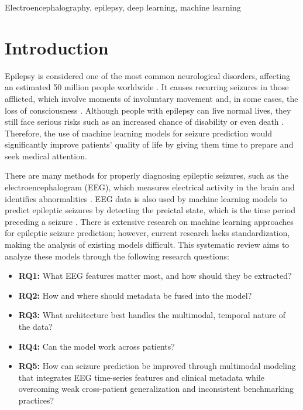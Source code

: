 \documentclass[conference]{IEEEtran}
\begin{document}
\begin{IEEEkeywords}
Electroencephalography, epilepsy, deep learning, machine learning
\end{IEEEkeywords}

\section{Introduction}
Epilepsy is considered one of the most common neurological disorders, affecting an estimated 50 million people worldwide \cite{who2024epilepsy}. It causes recurring seizures in those afflicted, which involve moments of involuntary movement and, in some cases, the loss of consciousness \cite{who2024epilepsy}. Although people with epilepsy can live normal lives, they still face serious risks such as an increased chance of disability or even death \cite{ninds2025epilepsy}. Therefore, the use of machine learning models for seizure prediction would significantly improve patients' quality of life by giving them time to prepare and seek medical attention. 

There are many methods for properly diagnosing epileptic seizures, such as the electroencephalogram (EEG), which measures electrical activity in the brain and identifies abnormalities \cite{ninds2025epilepsy}. EEG data is also used by machine learning models to predict epileptic seizures by detecting the preictal state, which is the time period preceding a seizure \cite{mourad2025seizurerecognition}. There is extensive research on machine learning approaches for epileptic seizure prediction; however, current research lacks standardization, making the analysis of existing models difficult. This systematic review aims to analyze these models through the following research questions:

\begin{itemize}
\item \textbf{RQ1:} What EEG features matter most, and how should they be extracted?

\item \textbf{RQ2:} How and where should metadata be fused into the model?

\item \textbf{RQ3:} What architecture best handles the multimodal, temporal nature of the data?

\item \textbf{RQ4:} Can the model work across patients?

\item \textbf{RQ5:} How can seizure prediction be improved through multimodal modeling that integrates EEG time-series features and clinical metadata while overcoming weak cross-patient generalization and inconsistent benchmarking practices?

\end{itemize}
\end{document}
